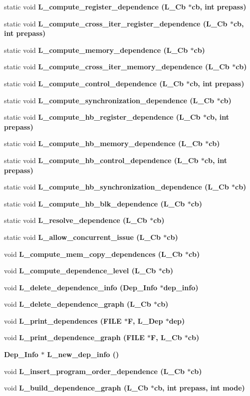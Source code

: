 \begin{CompactItemize}
\item 
static void \bf{L\_\-compute\_\-register\_\-dependence} (L\_\-Cb $\ast$cb, int prepass)
\item 
static void \bf{L\_\-compute\_\-cross\_\-iter\_\-register\_\-dependence} (L\_\-Cb $\ast$cb, int prepass)
\item 
static void \bf{L\_\-compute\_\-memory\_\-dependence} (L\_\-Cb $\ast$cb)
\item 
static void \bf{L\_\-compute\_\-cross\_\-iter\_\-memory\_\-dependence} (L\_\-Cb $\ast$cb)
\item 
static void \bf{L\_\-compute\_\-control\_\-dependence} (L\_\-Cb $\ast$cb, int prepass)
\item 
static void \bf{L\_\-compute\_\-synchronization\_\-dependence} (L\_\-Cb $\ast$cb)
\item 
static void \bf{L\_\-compute\_\-hb\_\-register\_\-dependence} (L\_\-Cb $\ast$cb, int prepass)
\item 
static void \bf{L\_\-compute\_\-hb\_\-memory\_\-dependence} (L\_\-Cb $\ast$cb)
\item 
static void \bf{L\_\-compute\_\-hb\_\-control\_\-dependence} (L\_\-Cb $\ast$cb, int prepass)
\item 
static void \bf{L\_\-compute\_\-hb\_\-synchronization\_\-dependence} (L\_\-Cb $\ast$cb)
\item 
static void \bf{L\_\-compute\_\-hb\_\-blk\_\-dependence} (L\_\-Cb $\ast$cb)
\item 
static void \bf{L\_\-resolve\_\-dependence} (L\_\-Cb $\ast$cb)
\item 
static void \bf{L\_\-allow\_\-concurrent\_\-issue} (L\_\-Cb $\ast$cb)
\item 
void \bf{L\_\-compute\_\-mem\_\-copy\_\-dependences} (L\_\-Cb $\ast$cb)
\item 
void \bf{L\_\-compute\_\-dependence\_\-level} (L\_\-Cb $\ast$cb)
\item 
void \bf{L\_\-delete\_\-dependence\_\-info} (\bf{Dep\_\-Info} $\ast$dep\_\-info)
\item 
void \bf{L\_\-delete\_\-dependence\_\-graph} (L\_\-Cb $\ast$cb)
\item 
void \bf{L\_\-print\_\-dependences} (FILE $\ast$\bf{F}, \bf{L\_\-Dep} $\ast$dep)
\item 
void \bf{L\_\-print\_\-dependence\_\-graph} (FILE $\ast$\bf{F}, L\_\-Cb $\ast$cb)
\item 
\bf{Dep\_\-Info} $\ast$ \bf{L\_\-new\_\-dep\_\-info} ()
\item 
void \bf{L\_\-insert\_\-program\_\-order\_\-dependence} (L\_\-Cb $\ast$cb)
\item 
void \bf{L\_\-build\_\-dependence\_\-graph} (L\_\-Cb $\ast$cb, int prepass, int \bf{mode})
\end{CompactItemize}
